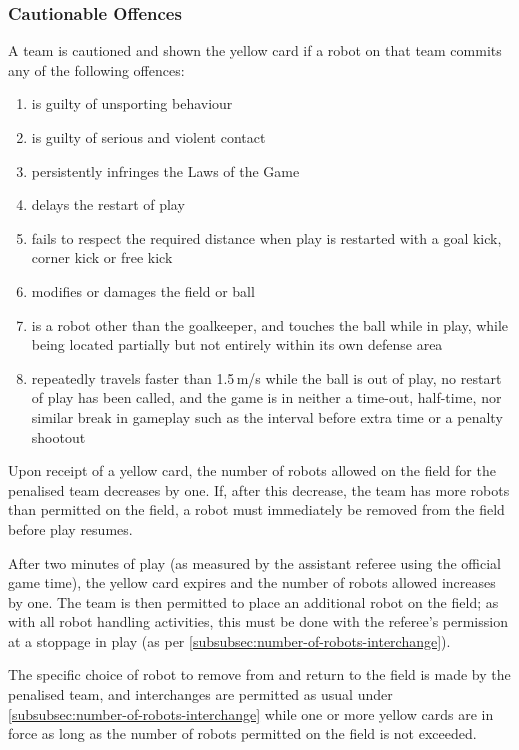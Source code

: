 \subsubsection{Cautionable Offences}
A team is cautioned and shown the yellow card if a robot on that team commits any of the following offences:
\begin{enumerate}
\item is guilty of unsporting behaviour
\item is guilty of serious and violent contact
\item persistently infringes the Laws of the Game
\item delays the restart of play
\item fails to respect the required distance when play is restarted with a goal kick, corner kick or free kick
\item modifies or damages the field or ball
\item is a robot other than the goalkeeper, and touches the ball while in play, while being located partially but not entirely within its own defense area
\item repeatedly travels faster than 1.5\,m/s while the ball is
out of play, no restart of play has been called, and the game is in neither a
time-out, half-time, nor similar break in gameplay such as the interval before
extra time or a penalty shootout
\end{enumerate}

Upon receipt of a yellow card, the number of robots allowed on the field for the penalised team decreases by one.
If, after this decrease, the team has more robots than permitted on the field, a robot must immediately be removed from the field before play resumes.

After two minutes of play (as measured by the assistant referee using the official game time), the yellow card expires and the number of robots allowed increases by one.
The team is then permitted to place an additional robot on the field; as with all robot handling activities, this must be done with the referee's permission at a stoppage in play (as per \autoref{subsubsec:number-of-robots-interchange}).

The specific choice of robot to remove from and return to the field is made by the penalised team, and interchanges are permitted as usual under \autoref{subsubsec:number-of-robots-interchange} while one or more yellow cards are in force as long as the number of robots permitted on the field is not exceeded.

